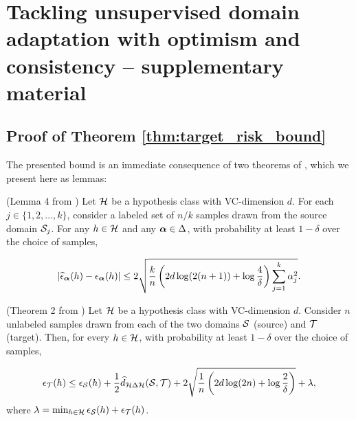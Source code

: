 
\chapter{Tackling unsupervised domain adaptation with optimism and consistency -- supplementary material} %

\label{appendix:modafm} %

\section{Proof of Theorem \ref{thm:target_risk_bound}}
\label{sec:thm_proof}

The presented bound is an immediate consequence of two theorems of \cite{BenDavid2010, Blitzer2008}, which we present here as lemmas:

\begin{lemma}
	\label{lemma:bound_mixture}
	(Lemma 4 from \citet{Blitzer2008}) Let ${\mathcal{H}}$ be a hypothesis class with VC-dimension $d$. For each $j \in \{1,2,...,k\}$, consider a labeled set of $n/k$ samples drawn from the source domain ${\mathcal{S}}_j$. For any $h \in {\mathcal{H}}$ and any ${\bm{\alpha}} \in \Delta$, with probability at least $1-\delta$ over the choice of samples,

	\begin{equation}
	|\widehat{\epsilon}_{\bm{\alpha}}(h) - \epsilon_{\bm{\alpha}}(h)| \leq 2\sqrt{\frac{k}{n} \left(2d\log(2(n+1)) + \log \frac{4}{\delta}\right) \sum_{j=1}^k {\alpha}_j^2}.
	\end{equation}
\end{lemma}

\begin{lemma}
	\label{lemma:bound_single_source}
	(Theorem 2 from \citet{BenDavid2010}) Let ${\mathcal{H}}$ be a hypothesis class with VC-dimension $d$. Consider $n$ unlabeled samples drawn from each of the two domains ${\mathcal{S}}$ (source) and ${\mathcal{T}}$ (target). Then, for every $h \in {\mathcal{H}}$, with probability at least $1-\delta$ over the choice of samples,

	\begin{equation}
	\epsilon_{\mathcal{T}}(h) \leq \epsilon_{\mathcal{S}}(h) + \frac{1}{2} \widehat{d}_{{\mathcal{H}} \Delta {\mathcal{H}}}({\mathcal{S}}, {\mathcal{T}}) + 2\sqrt{\frac{1}{n} \left( 2d\log(2n) + \log \frac{2}{\delta} \right)} + \lambda,
	\end{equation}
	where $\lambda = \min_{h \in {\mathcal{H}}} \epsilon_{\mathcal{S}}(h) + \epsilon_{\mathcal{T}}(h)$.
\end{lemma}

